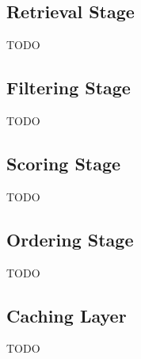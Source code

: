 

\subsection{Retrieval Stage}

TODO 

\subsection{Filtering Stage}

TODO

\subsection{Scoring Stage}

TODO

\subsection{Ordering Stage}

TODO

\subsection{Caching Layer}

TODO
